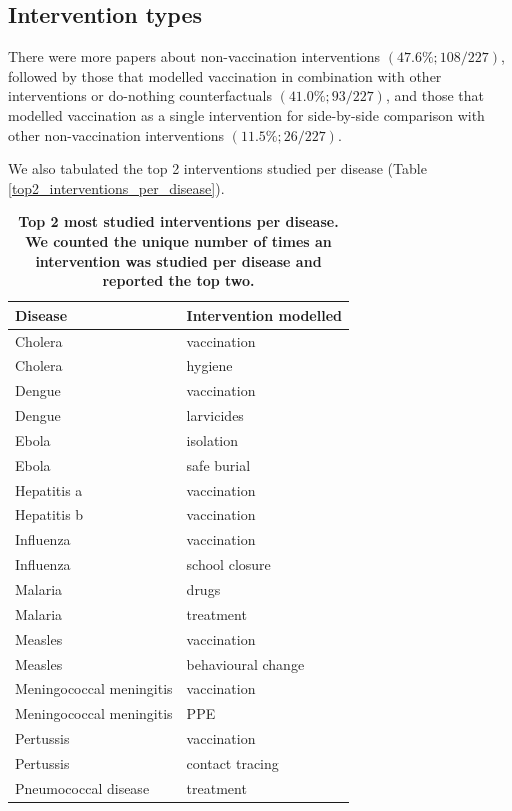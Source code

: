 \documentclass[10pt,letterpaper]{article}
\begin{document}
\subsection*{Intervention types}
There were more papers about non-vaccination interventions $(47.6\%; 108/227)$, followed by those that modelled vaccination in combination with other interventions or do-nothing counterfactuals $(41.0\%; 93/227)$, and those that modelled vaccination as a single intervention for side-by-side comparison with other non-vaccination interventions $(11.5\%; 26/227)$. 

We also tabulated the top 2 interventions studied per disease (Table \ref{top2_interventions_per_disease}).

\begin{table}
	\setlength\arrayrulewidth{1pt} 
	\centering
	\caption{\bf Top 2 most studied interventions per disease. We counted the unique number of times an intervention was studied per disease and reported the top two.}
		\begin{tabular}{| l | l |}
			\hline
			\textbf{Disease} & \textbf{Intervention modelled} \\ \hline
			Cholera & vaccination \\ \hline
			Cholera & hygiene \\ \hline
			Dengue & vaccination \\ \hline
			Dengue & larvicides \\ \hline
			Ebola & isolation \\ \hline
			Ebola & safe burial \\ \hline
			Hepatitis a & vaccination \\ \hline
			Hepatitis b & vaccination \\ \hline
			Influenza & vaccination \\ \hline
			Influenza & school closure \\ \hline
			Malaria & drugs \\ \hline
			Malaria & treatment \\ \hline
			Measles & vaccination \\ \hline
			Measles & behavioural change \\ \hline
			Meningococcal meningitis & vaccination \\ \hline
			Meningococcal meningitis & PPE \\ \hline
			Pertussis & vaccination \\ \hline
			Pertussis & contact tracing \\ \hline
			Pneumococcal disease & treatment \\ \hline

\end{tabular}
\end{table}
\end{document}
